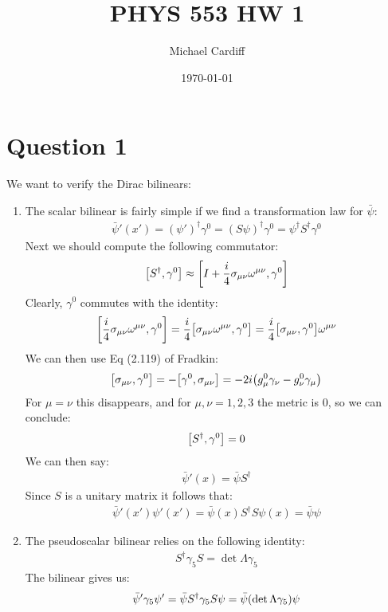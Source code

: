 \documentclass[12pt]{article}
\title{\vspace{-3em}PHYS 553 HW 1}
\author{Michael Cardiff}
\date{\today}
\newcommand{\g}{\gamma}
\newcommand{\psib}{\bar{\psi}}
\newcommand{\psid}{\psi^\dag}
\begin{document}
\maketitle
\section*{Question 1}
We want to verify the Dirac bilinears:
\begin{enumerate}
\item The scalar bilinear is fairly simple if we find a transformation law for $\psib$:
  \begin{align*}
    \psib'(x')=(\psi')^\dag\g^0=(S\psi)^\dag\g^0=\psid S^\dag\g^0
  \end{align*}
  Next we should compute the following commutator:
  \begin{align*}
    \comm{S^\dag}{\g^0}\approx
    \comm{I+\frac{i}{4}\sigma_{\mu\nu}\omega^{\mu\nu}}{\g^0}
  \end{align*}
  Clearly, $\g^0$ commutes with the identity:
  \begin{align*}
    \comm{\frac{i}{4}\sigma_{\mu\nu}\omega^{\mu\nu}}{\g^0}=
    \frac{i}{4}\comm{\sigma_{\mu\nu}\omega^{\mu\nu}}{\g^0}=
    \frac{i}{4}\comm{\sigma_{\mu\nu}}{\g^0}\omega^{\mu\nu}
  \end{align*}
  We can then use Eq (2.119) of Fradkin:
  \begin{align*}
    \comm{\sigma_{\mu\nu}}{\g^0}=-\comm{\g^0}{\sigma_{\mu\nu}}=
    -2i\qty(g^0_\mu\gamma_\nu-g^0_\nu\gamma_\mu)
  \end{align*}
  For $\mu=\nu$ this disappears, and for $\mu,\nu=1,2,3$ the metric is $0$, so we can conclude:
  \begin{align*}
    \comm{S^\dag}{\g^0}=0
  \end{align*}
  We can then say:
  \begin{align*}
    \psib'(x)=\psib S^\dag
  \end{align*}
  Since $S$ is a unitary matrix it follows that:
  \begin{align*}
    \psib'(x')\psi'(x')=\psib(x)S^\dag S\psi(x)=\psib\psi
  \end{align*}
\item The pseudoscalar bilinear relies on the following identity:
  \begin{align*}
    S^\dag\g_5S=\det\Lambda\g_5
  \end{align*}
  The bilinear gives us:
  \begin{align*}
    \psib'\g_5\psi'=\psib S^\dag\g_5 S\psi=\psib\qty(\det\Lambda\g_5)\psi

\end{align*}
\end{enumerate}
\end{document}
